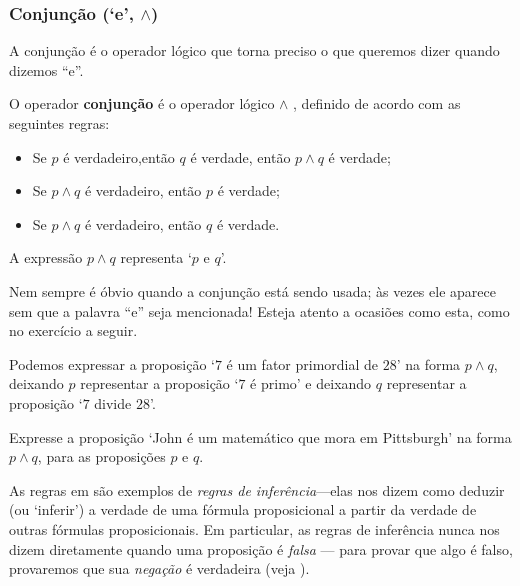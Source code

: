 \subsubsection*{Conjunção (`e', $\wedge$)}

A conjunção é o operador lógico que torna preciso o que queremos dizer quando dizemos “e”.
\begin{idefinition}
\label{defConjunction}
O operador \textbf{conjunção} é o operador lógico $\wedge$ , definido de acordo com as seguintes regras:
\begin{itemize}
\item \introrule{\wedge} Se $p$ é verdadeiro,então $q$ é verdade, então $p \wedge q$ é verdade;
\item {} Se $p \wedge q$ é verdadeiro, então $p$ é verdade;
\item {} Se $p \wedge q$ é verdadeiro, então $q$ é verdade.
\end{itemize}
A expressão $p \wedge q$ representa `$p$ e $q$'.
\end{idefinition}

Nem sempre é óbvio quando a conjunção está sendo usada; às vezes ele aparece sem que a palavra “e” seja mencionada! Esteja atento a ocasiões como esta, como no exercício a seguir.

\begin{example}
\label{exSevenDividesTwentyEightConjunction}
Podemos expressar a proposição `$7$ é um fator primordial de $28$' na forma $p \wedge q$, deixando $p$ representar a proposição `$7$ é primo' e deixando $q$ representar a proposição `$7$ divide $28$'.
\end{example}

\begin{exercise}
\label{exJohnMathematicianPittsburgh}
Expresse a proposição `John é um matemático que mora em Pittsburgh' na forma $p \wedge q$, para as proposições $p$ e $q$.
\end{exercise}

As regras em  são exemplos de \textit{regras de inferência}---elas nos dizem como deduzir (ou `inferir') a verdade de uma fórmula proposicional a partir da verdade de outras fórmulas proposicionais. Em particular, as regras de inferência nunca nos dizem diretamente quando uma proposição é \textit{falsa} --- para provar que algo é falso, provaremos que sua \textit{negação} é verdadeira (veja ).

